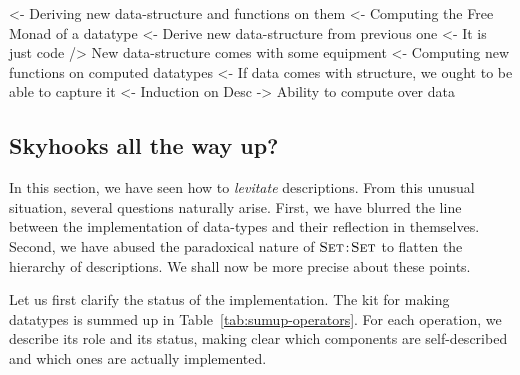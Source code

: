 \begin{wstructure}
<- Deriving new data-structure and functions on them
    <- Computing the Free Monad of a datatype
        <- Derive new data-structure from previous one
            <- It is just code
        /> New data-structure comes with some equipment
    <- Computing new functions on computed datatypes
        <- If data comes with structure, we ought to be able to capture it
            <- Induction on Desc
            -> Ability to compute over data
\end{wstructure}


\subsection{Skyhooks all the way up?}


In this section, we have seen how to \emph{levitate}
descriptions. From this unusual situation, several questions naturally
arise. First, we have blurred the line between the implementation of
data-types and their reflection in themselves. Second, we have abused
the paradoxical nature of $\Bhab{\Set}{\Set}$ to flatten the hierarchy
of descriptions. We shall now be more precise about these points.


Let us first clarify the status of the implementation. The kit for
making datatypes is summed up in Table~\ref{tab:sumup-operators}. For
each operation, we describe its role and its status, making clear
which components are self-described and which ones are actually
implemented.

